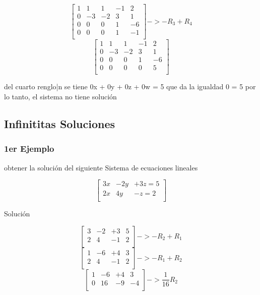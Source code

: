 \documentclass{article}
\begin{document}
\[
\begin{bmatrix}
 1 & 1 & 1 & -1  & 2  \\
 0& -3 & -2 & 3  & 1 \\
 0 & 0 & 0 & 1   &  -6 \\
 0 & 0 & 0 &  1 &  -1 \\
\end{bmatrix}
-> -R_3+R_4
\]
\[
\begin{bmatrix}
 1 & 1 & 1 & -1  & 2  \\
 0& -3 & -2 & 3  & 1 \\
 0 & 0 & 0 & 1   &  -6 \\
 0 & 0 & 0 &  0 &  5 \\
\end{bmatrix}
\]

del cuarto renglo|n se tiene 0x + 0y + 0z + 0w = 5
que da la igualdad 0 = 5
por lo tanto, el sistema no tiene solución



\subsection{Infinititas Soluciones}

\subsubsection{1er Ejemplo}

obtener la solución del siguiente Sistema de ecuaciones lineales

\[
\begin{bmatrix}
 3x & -2y & + 3z = 5  \\
 2x & 4y & -z = 2  \\
\end{bmatrix}
\]

Solución

\[
\begin{bmatrix}
 3 & -2 & + 3 & 5  \\
 2 & 4 & -1 & 2  \\
\end{bmatrix}
-> -R_2+ R_1
\]
\[
\begin{bmatrix}
 1 & -6 & + 4 & 3  \\
 2 & 4 & -1 & 2  \\
\end{bmatrix}
-> -R_1+ R_2
\]
\[
\begin{bmatrix}
 1 & -6 & + 4 & 3  \\
 0 & 16 & -9 & -4  \\
\end{bmatrix}
-> \frac{1}{16}R_2
\]
\end{document}
